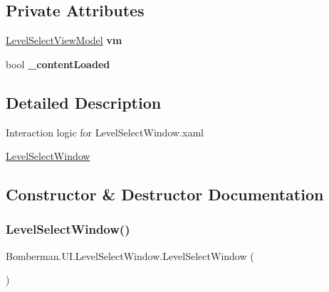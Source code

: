 \subsection*{Private Attributes}
\begin{DoxyCompactItemize}
\item 
\mbox{\label{class_bomberman_1_1_u_i_1_1_level_select_window_a4afa7036f6ca5e196edbb1e3e79af83d}} 
\mbox{\hyperlink{class_bomberman_1_1_u_i_1_1_view_models_1_1_level_select_view_model}{Level\+Select\+View\+Model}} {\bfseries vm}
\item 
\mbox{\label{class_bomberman_1_1_u_i_1_1_level_select_window_a90630d4deb2803c9788bd5a274995291}} 
bool {\bfseries \+\_\+content\+Loaded}
\end{DoxyCompactItemize}


\subsection{Detailed Description}
Interaction logic for Level\+Select\+Window.\+xaml 

\mbox{\hyperlink{class_bomberman_1_1_u_i_1_1_level_select_window}{Level\+Select\+Window}}

\subsection{Constructor \& Destructor Documentation}
\mbox{\label{class_bomberman_1_1_u_i_1_1_level_select_window_a0e171b2f7d9c376c1b3b12b836b383f0}} 
\subsubsection{\texorpdfstring{LevelSelectWindow()}{LevelSelectWindow()}}
{\footnotesize\ttfamily Bomberman.\+U\+I.\+Level\+Select\+Window.\+Level\+Select\+Window (\begin{DoxyParamCaption}{ }\end{DoxyParamCaption})\hspace{0.3cm}{\ttfamily [inline]}}



